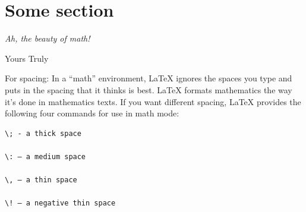 
\usepackage{epigraph}                                      %
\setlength{\epigraphwidth}{0.8\columnwidth}                %
\section{Some section}
  \epigraph{\emph{Ah, the beauty of math!}}{Yours Truly}

\usepackage{endnotes}
\renewcommand{\theendnote}{\Roman{endnote}}                %
\begingroup
{}
\renewcommand{\enotesize}{\small}
\theendnotes
\endgroup

For spacing: In a ``math'' environment, LaTeX ignores the spaces you type and 
puts in the spacing that it thinks is best. LaTeX formats mathematics the
way it’s done in mathematics texts. If you want different spacing, LaTeX 
provides the following four commands for use in math mode: 

\begin{verbatim}
\; - a thick space

\: – a medium space

\, – a thin space

\! – a negative thin space 
  \end{verbatim}


